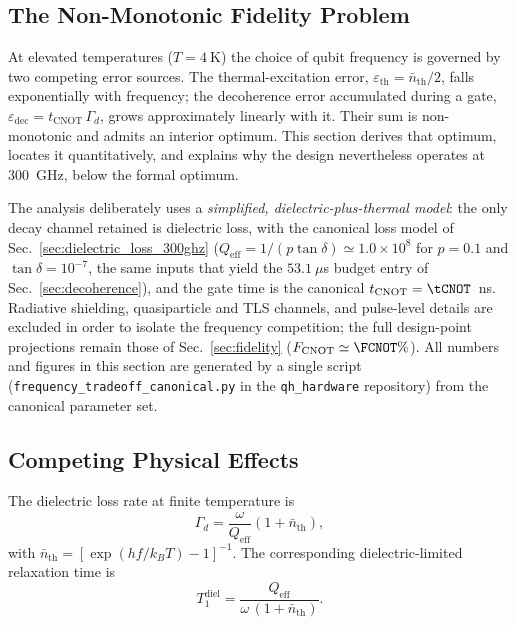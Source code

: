 \subsection{The Non-Monotonic Fidelity Problem}

At elevated temperatures ($T = \SI{4}{\kelvin}$) the choice of qubit frequency
is governed by two competing error sources. The thermal-excitation error,
$\varepsilon_{\text{th}} = \bar{n}_{\text{th}}/2$, falls exponentially with
frequency; the decoherence error accumulated during a gate,
$\varepsilon_{\text{dec}} = t_{\text{CNOT}}\,\Gamma_d$, grows approximately
linearly with it. Their sum is non-monotonic and admits an interior optimum.
This section derives that optimum, locates it quantitatively, and explains why
the design nevertheless operates at \SI{300}{\giga\hertz}, below the formal
optimum.

The analysis deliberately uses a \emph{simplified, dielectric-plus-thermal
model}: the only decay channel retained is dielectric loss, with the canonical
loss model of Sec.~\ref{sec:dielectric_loss_300ghz}
($Q_{\text{eff}} = 1/(p\tan\delta) \simeq 1.0\times10^{8}$ for $p = 0.1$ and
$\tan\delta = 10^{-7}$, the same inputs that yield the $53.1~\mu$s budget entry
of Sec.~\ref{sec:decoherence}), and the gate time is the canonical
$t_{\text{CNOT}} = \tCNOT$~ns. Radiative shielding, quasiparticle and TLS
channels, and pulse-level details are excluded in order to isolate the
frequency competition; the full design-point projections remain those of
Sec.~\ref{sec:fidelity} ($F_{\text{CNOT}} \simeq \FCNOT\%$). All numbers and
figures in this section are generated by a single script
(\texttt{frequency\_tradeoff\_canonical.py} in the \texttt{qh\_hardware}
repository) from the canonical parameter set.

\subsection{Competing Physical Effects}

The dielectric loss rate at finite temperature is
\begin{equation}
\Gamma_d = \frac{\omega}{Q_{\text{eff}}} \left(1 + \bar{n}_{\text{th}}\right),
\label{eq:dielectric_loss_full}
\end{equation}
with $\bar{n}_{\text{th}} = [\exp(hf/k_BT) - 1]^{-1}$. The corresponding
dielectric-limited relaxation time is
\begin{equation}
T_1^{\text{diel}} = \frac{Q_{\text{eff}}}{\omega\,(1 + \bar{n}_{\text{th}})} .
\end{equation}

